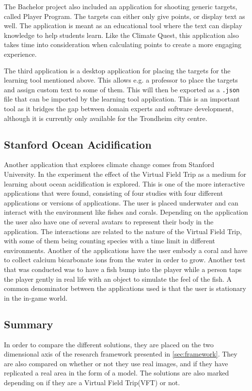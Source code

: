         The Bachelor project also included an application for shooting generic targets, called Player Program. The targets can either only give points, or display text as well. The application is meant as an educational tool where the text can display knowledge to help students learn. Like the Climate Quest, this application also takes time into consideration when calculating points to create a more engaging experience.
        
        The third application is a desktop application for placing the targets for the learning tool mentioned above. This allows e.g. a professor to place the targets and assign custom text to some of them. This will then be exported as a \texttt{.json} file that can be imported by the learning tool application. This is an important tool as it bridges the gap between domain experts and software development, although it is currently only available for the Trondheim city centre.
        
    \subsection{Stanford Ocean Acidification}
        Another application that explores climate change comes from Stanford University\cite{virtual_field_trips_learning}. In the experiment the effect of the Virtual Field Trip as a medium for learning about ocean acidification is explored. This is one of the more interactive applications that were found, consisting of four studies with four different applications or versions of applications. The user is placed underwater and can interact with the environment like fishes and corals. Depending on the application the user also have one of several avatars to represent their body in the application. The interactions are related to the nature of the Virtual Field Trip, with some of them being counting species with a time limit in different environments. Another of the applications have the user embody a coral and have to collect calcium bicarbonate ions from the water in order to grow. Another test that was conducted was to have a fish bump into the player while a person taps the player gently in real life with an object to simulate the feel of the fish. A common denominator between the applications used is that the user is stationary in the in-game world.
        
    \subsection{Summary}
        \label{sec:summary}
        In order to compare the different solutions, they are placed on the two dimensional axis of the research framework presented in \cref{sec:framework}. They are also compared on whether or not they use real images, and if they have replicated a real area in the form of a model. The solutions are also marked depending on if they are a Virtual Field Trip(VFT) or not.
        
